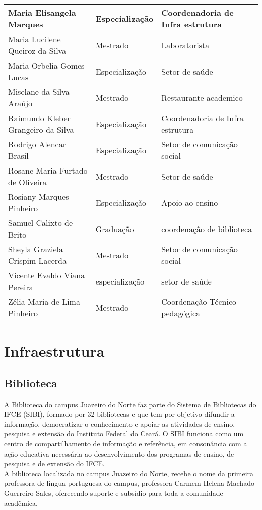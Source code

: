 \begin{longtable}{|p{6cm}|p{3cm}|p{4cm}|}
\hline
Maria Elisangela Marques & Especialização & Coordenadoria de Infra estrutura\\
\hline
Maria Lucilene Queiroz da Silva & Mestrado & Laboratorista\\
\hline
Maria Orbelia Gomes Lucas & Especialização & Setor de saúde\\
\hline
Miselane da Silva Araújo & Mestrado & Restaurante academico\\
\hline
Raimundo Kleber Grangeiro da Silva & Especialização & Coordenadoria de Infra estrutura\\
\hline
Rodrigo Alencar Brasil & Especialização & Setor de comunicação social\\
\hline
Rosane Maria Furtado de Oliveira & Mestrado & Setor de saúde\\
\hline
Rosiany Marques Pinheiro & Especialização & Apoio ao ensino\\
\hline
Samuel Calixto de Brito & Graduação & coordenação de biblioteca\\
\hline
Sheyla Graziela Crispim Lacerda & Mestrado & Setor de comunicação social\\
\hline
Vicente Evaldo Viana Pereira & especialização & setor de saúde\\
\hline
Zélia Maria de Lima Pinheiro & Mestrado & Coordenação Técnico pedagógica\\
\hline

\end{longtable}


\chapter{Infraestrutura}

\section{Biblioteca}
A Biblioteca do campus Juazeiro do Norte faz parte do Sistema de Bibliotecas do IFCE (SIBI), formado por 32 bibliotecas e que tem por objetivo difundir a informação, democratizar o conhecimento e apoiar as atividades de ensino, pesquisa e extensão do Instituto Federal do Ceará. O SIBI funciona como um centro de compartilhamento de informação e referência, em consonância com a ação educativa necessária ao desenvolvimento dos programas de ensino, de pesquisa e de extensão do IFCE.\\

A biblioteca localizada no campus Juazeiro do Norte, recebe o nome da primeira professora de língua portuguesa do campus, professora Carmem Helena Machado Guerreiro Sales, oferecendo suporte e subsídio para toda a comunidade acadêmica.\\

